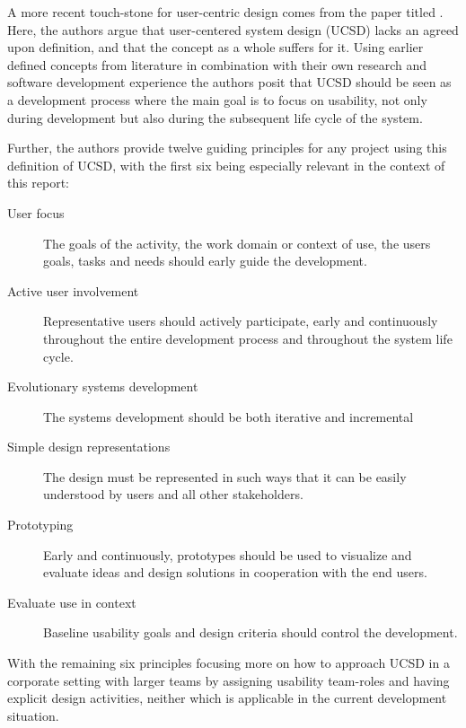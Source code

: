 A more recent touch-stone for user-centric design comes from the
\citeyear{citeKeyPrinciplesUserCentric} paper titled
\cite{citeKeyPrinciplesUserCentric}.
Here, the authors argue that user-centered system design (UCSD) lacks an agreed
upon definition, and that the concept as a whole suffers for it. Using earlier
defined concepts from literature in combination with their own research and
software development experience the authors posit that UCSD should be seen as a
development process where the main goal is to focus on usability, not only
during development but also during the subsequent life cycle of the system.

Further, the authors provide twelve guiding
principles\cite[p. 401]{citeKeyPrinciplesUserCentric}
for any project using this definition of UCSD, with the first six being
especially relevant in the context of this report:


\begin{description}
  \item[User focus]{%
    The goals of the activity, the work domain or
    context of use, the users goals, tasks and  needs should early guide
    the development.%
  }
  \item[Active user involvement]{%
    Representative users should actively
    participate, early and continuously throughout the entire development
    process and throughout the system life cycle.%
  }
  \item[Evolutionary systems development]{The systems development should be
  both iterative and incremental%
  }
  \item[Simple design representations]{%
    The design must be represented in
    such ways that it can be easily understood by users and all other
    stakeholders.%
  }
  \item[Prototyping]{%
    Early and continuously, prototypes should be used to
    visualize and evaluate ideas and design solutions in cooperation with
    the end users.%
  }
  \item[Evaluate use in context]{%
    Baseline usability goals and design
    criteria should control the development.%
  }
\end{description}

With the remaining six principles focusing more on how to approach UCSD in a
corporate setting with larger teams by assigning usability team-roles and
having explicit design activities, neither which is applicable in the current
development situation.

